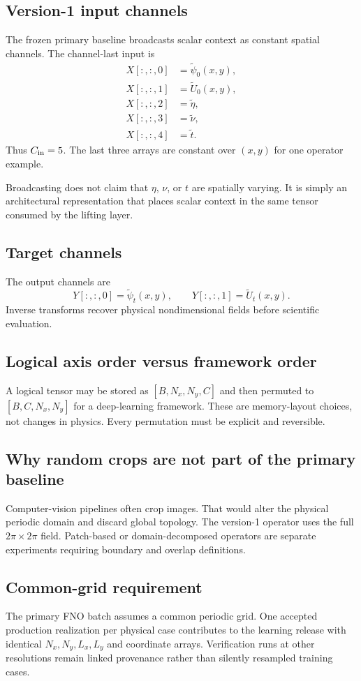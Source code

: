\documentclass[11pt]{article}
\begin{document}
\subsection{Version-1 input channels}
The frozen primary baseline broadcasts scalar context as constant spatial channels. The channel-last input is
\begin{align}
X[:,:,0]&=\widetilde\psi_0(x,y),\\
X[:,:,1]&=\widetilde U_0(x,y),\\
X[:,:,2]&=\widetilde\eta,\\
X[:,:,3]&=\widetilde\nu,\\
X[:,:,4]&=\widetilde t.
\end{align}
Thus $C_{\rm in}=5$. The last three arrays are constant over $(x,y)$ for one operator example.

Broadcasting does not claim that $\eta$, $\nu$, or $t$ are spatially varying. It is simply an architectural representation that places scalar context in the same tensor consumed by the lifting layer.

\subsection{Target channels}
The output channels are
\[
Y[:,:,0]=\widetilde\psi_t(x,y),\qquad
Y[:,:,1]=\widetilde U_t(x,y).
\]
Inverse transforms recover physical nondimensional fields before scientific evaluation.

\subsection{Logical axis order versus framework order}
A logical tensor may be stored as $[B,N_x,N_y,C]$ and then permuted to $[B,C,N_x,N_y]$ for a deep-learning framework. These are memory-layout choices, not changes in physics. Every permutation must be explicit and reversible.

\subsection{Why random crops are not part of the primary baseline}
Computer-vision pipelines often crop images. That would alter the physical periodic domain and discard global topology. The version-1 operator uses the full $2\pi\times2\pi$ field. Patch-based or domain-decomposed operators are separate experiments requiring boundary and overlap definitions.

\subsection{Common-grid requirement}
The primary FNO batch assumes a common periodic grid. One accepted production realization per physical case contributes to the learning release with identical $N_x,N_y,L_x,L_y$ and coordinate arrays. Verification runs at other resolutions remain linked provenance rather than silently resampled training cases.
\end{document}
